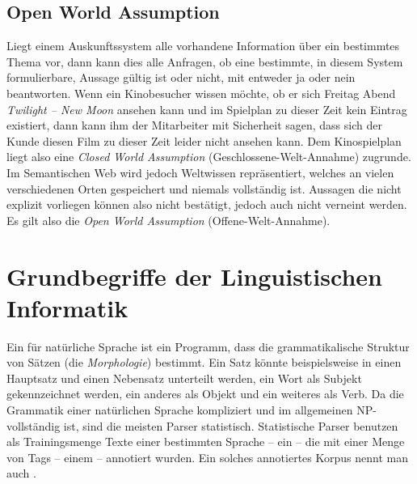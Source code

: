 \subsection{Open World Assumption}
Liegt einem Auskunftssystem alle vorhandene Information über ein bestimmtes Thema vor, dann kann dies alle Anfragen, ob eine bestimmte, in diesem System formulierbare, Aussage gültig ist oder nicht, mit entweder ja oder nein beantworten.
Wenn ein Kinobesucher wissen möchte, ob er sich Freitag Abend \emph{Twilight -- New Moon} ansehen kann und im Spielplan zu dieser Zeit kein Eintrag existiert, dann kann ihm der Mitarbeiter mit Sicherheit sagen,
dass sich der Kunde diesen Film zu dieser Zeit leider nicht ansehen kann.
Dem Kinospielplan liegt also eine \emph{Closed World Assumption} (Geschlossene-Welt-Annahme) zugrunde.
Im Semantischen Web wird jedoch Weltwissen repräsentiert, welches an vielen verschiedenen Orten gespeichert und niemals vollständig ist.
Aussagen die nicht explizit vorliegen können also nicht bestätigt, jedoch auch nicht verneint werden.
Es gilt also die \emph{Open World Assumption} (Offene-Welt-Annahme).


\section{Grundbegriffe der Linguistischen Informatik}

Ein  für natürliche Sprache ist ein Programm, dass die grammatikalische Struktur von Sätzen (die \emph{Morphologie}) bestimmt.
Ein Satz könnte beispielsweise in einen Hauptsatz und einen Nebensatz unterteilt werden, ein Wort als Subjekt gekennzeichnet werden, ein anderes als Objekt und ein weiteres als Verb.
Da die Grammatik einer natürlichen Sprache kompliziert und im allgemeinen NP-vollständig ist, sind die meisten Parser statistisch.
Statistische Parser benutzen als Trainingsmenge Texte einer bestimmten Sprache -- ein  -- die mit einer Menge von Tags -- einem  -- annotiert wurden.
Ein solches annotiertes Korpus nennt man auch .

